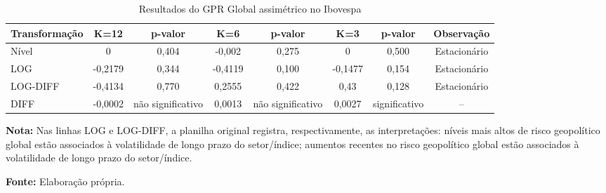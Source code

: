 \begin{table}[H]
\centering
\caption{Resultados do GPR Global assimétrico no Ibovespa}
\label{tab:gpr-global-assimetrico-ibov}
\small
\begin{adjustbox}{max width=\textwidth}
\begin{tabular}{@{}lccccccc@{}}
\toprule
Transformação & K=12 & p-valor & K=6 & p-valor & K=3 & p-valor & Observação \\
\midrule
Nível & 0 & 0,404 & -0,002 & 0,275 & 0 & 0,500 & Estacionário \\
LOG & -0,2179 & 0,344 & -0,4119 & 0,100 & -0,1477 & 0,154 & Estacionário \\
LOG-DIFF & -0,4134 & 0,770 & 0,2555 & 0,422 & 0,43 & 0,128 & Estacionário \\
DIFF & -0,0002 & não significativo & 0,0013 & não significativo & 0,0027 & significativo & -- \\
\bottomrule
\end{tabular}
\end{adjustbox}
\vspace{1mm}
\begin{minipage}{\textwidth}
\footnotesize
\textbf{Nota:} Nas linhas LOG e LOG-DIFF, a planilha original registra, respectivamente, as interpretações: níveis mais altos de risco geopolítico global estão associados à volatilidade de longo prazo do setor/índice; aumentos recentes no risco geopolítico global estão associados à volatilidade de longo prazo do setor/índice.\par
\textbf{Fonte:} Elaboração própria.
\end{minipage}
\end{table}

